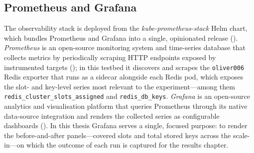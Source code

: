 \subsection{Prometheus and Grafana}
\label{subsec:observability}

The observability stack is deployed from the \textit{kube-prometheus-stack} Helm chart, which
bundles Prometheus and Grafana into a single, opinionated release
(\cite{artifacthub:kube-prometheus-stack}). \textit{Prometheus} is an open-source monitoring
system and time-series database that collects metrics by periodically scraping HTTP endpoints
exposed by instrumented targets (\cite{prometheus:overview}); in this testbed it discovers and
scrapes the \texttt{oliver006} Redis exporter that runs as a sidecar alongside each Redis pod,
which exposes the slot- and key-level series most relevant to the experiment---among them
\texttt{redis\_cluster\_slots\_assigned} and \texttt{redis\_db\_keys}. \textit{Grafana} is an
open-source analytics and visualisation platform that queries Prometheus through its native
data-source integration and renders the collected series as configurable dashboards
(\cite{grafana:github}). In this thesis Grafana serves a single, focused purpose: to render the
before-and-after panels---covered slots and total stored keys across the scale-in---on which
the outcome of each run is captured for the results chapter.
